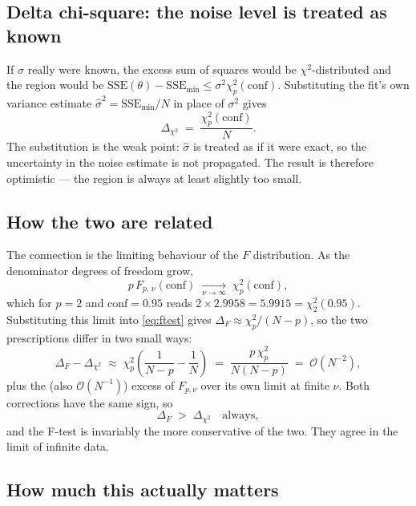 \documentclass[11pt,a4paper]{article}
\newcommand{\SSE}{\mathrm{SSE}}
\begin{document}
\subsection{Delta chi-square: the noise level is treated as known}

If $\sigma$ really were known, the excess sum of squares would be
$\chi^2$-distributed and the region would be
$\SSE(\theta)-\SSE_{\min}\le \sigma^2\chi^2_p(\text{conf})$. Substituting
the fit's own variance estimate $\hat{\sigma}^2=\SSE_{\min}/N$ in place of
$\sigma^2$ gives
\begin{equation}
\Delta_{\chi^2} \;=\; \frac{\chi^2_p(\text{conf})}{N}.
\label{eq:chi2}
\end{equation}
The substitution is the weak point: $\hat{\sigma}$ is treated as if it were
exact, so the uncertainty in the noise estimate is not propagated. The
result is therefore optimistic --- the region is always at least slightly
too small.

\subsection{How the two are related}

The connection is the limiting behaviour of the $F$ distribution. As the
denominator degrees of freedom grow,
\begin{equation}
p\,F_{p,\,\nu}(\text{conf}) \;\xrightarrow[\nu\to\infty]{}\; \chi^2_p(\text{conf}),
\end{equation}
which for $p=2$ and $\text{conf}=0.95$ reads
$2\times 2.9958 = 5.9915 = \chi^2_2(0.95)$. Substituting this limit into
\eqref{eq:ftest} gives $\Delta_{F}\approx \chi^2_p/(N-p)$, so the two
prescriptions differ in two small ways:
\begin{equation}
\Delta_{F}-\Delta_{\chi^2}
\;\approx\;
\chi^2_p\left(\frac{1}{N-p}-\frac{1}{N}\right)
\;=\;\frac{p\,\chi^2_p}{N(N-p)}
\;=\;\mathcal{O}\!\left(N^{-2}\right),
\end{equation}
plus the (also $\mathcal{O}(N^{-1})$) excess of $F_{p,\nu}$ over its own
limit at finite $\nu$. Both corrections have the same sign, so
\begin{equation}
\Delta_{F} \;>\; \Delta_{\chi^2} \quad\text{always},
\end{equation}
and the F-test is invariably the more conservative of the two. They agree
in the limit of infinite data.

\subsection{How much this actually matters}
\end{document}
